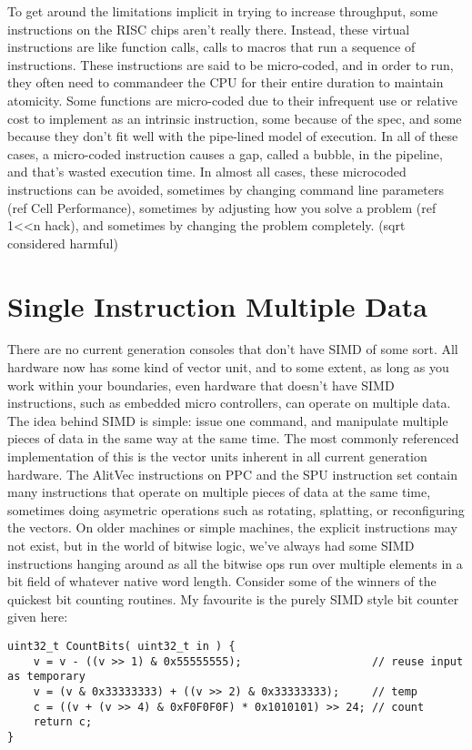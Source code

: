 To get around the limitations implicit in trying to increase throughput, some
instructions on the RISC chips aren't really there. Instead, these virtual
instructions are like function calls, calls to macros that run a sequence of
instructions. These instructions are said to be micro-coded, and in order to
run, they often need to commandeer the CPU for their entire duration to
maintain atomicity. Some functions are micro-coded due to their infrequent use
or relative cost to implement as an intrinsic instruction, some because of the
spec, and some because they don't fit well with the pipe-lined model of
execution. In all of these cases, a micro-coded instruction causes a gap,
called a bubble, in the pipeline, and that's wasted execution time.  In almost
all cases, these microcoded instructions can be avoided, sometimes by changing
command line parameters (ref Cell Performance), sometimes by adjusting how you
solve a problem (ref 1<<n hack), and sometimes by changing the problem
completely. (sqrt considered harmful)

\section{Single Instruction Multiple Data}

There are no current generation consoles that don't have SIMD of some sort. All
hardware now has some kind of vector unit, and to some extent, as long as you
work within your boundaries, even hardware that doesn't have SIMD instructions,
such as embedded micro controllers, can operate on multiple data.  The idea
behind SIMD is simple: issue one command, and manipulate multiple pieces of
data in the same way at the same time. The most commonly referenced
implementation of this is the vector units inherent in all current generation
hardware. The AlitVec instructions on PPC and the SPU instruction set contain
many instructions that operate on multiple pieces of data at the same time,
sometimes doing asymetric operations such as rotating, splatting, or
reconfiguring the vectors. On older machines or simple machines, the explicit
instructions may not exist, but in the world of bitwise logic, we've always had
some SIMD instructions hanging around as all the bitwise ops run over multiple
elements in a bit field of whatever native word length. Consider some of the
winners of the quickest bit counting routines. My favourite is the purely SIMD
style bit counter given here:

\begin{lstlisting}
uint32_t CountBits( uint32_t in ) {
	v = v - ((v >> 1) & 0x55555555);                    // reuse input as temporary
	v = (v & 0x33333333) + ((v >> 2) & 0x33333333);     // temp
	c = ((v + (v >> 4) & 0xF0F0F0F) * 0x1010101) >> 24; // count
	return c;
}
\end{lstlisting}

